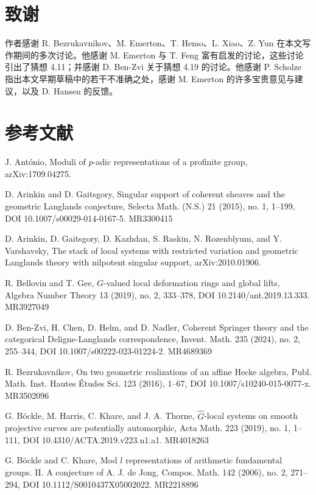 \section*{致谢}
作者感谢 R. Bezrukavnikov、M. Emerton、T. Hemo、L. Xiao、Z. Yun 在本文写作期间的多次讨论。他感谢 M. Emerton 与 T. Feng 富有启发的讨论，这些讨论引出了猜想 4.11；并感谢 D. Ben-Zvi 关于猜想 4.19 的讨论。他感谢 P. Scholze 指出本文早期草稿中的若干不准确之处，感谢 M. Emerton 的许多宝贵意见与建议，以及 D. Hansen 的反馈。

\section*{参考文献}
\begin{refs}
\item[{[1]}] J. Ant\'onio, Moduli of $p$-adic representations of a profinite group, arXiv:1709.04275.
\item[{[2]}] D. Arinkin and D. Gaitsgory, Singular support of coherent sheaves and the geometric Langlands conjecture, Selecta Math. (N.S.) 21 (2015), no. 1, 1--199, DOI 10.1007/s00029-014-0167-5. MR3300415
\item[{[3]}] D. Arinkin, D. Gaitsgory, D. Kazhdan, S. Raskin, N. Rozenblyum, and Y. Varshavsky, The stack of local systems with restricted variation and geometric Langlands theory with nilpotent singular support, arXiv:2010.01906.
\item[{[4]}] R. Bellovin and T. Gee, $G$-valued local deformation rings and global lifts, Algebra Number Theory 13 (2019), no. 2, 333--378, DOI 10.2140/ant.2019.13.333. MR3927049
\item[{[5]}] D. Ben-Zvi, H. Chen, D. Helm, and D. Nadler, Coherent Springer theory and the categorical Deligne-Langlands correspondence, Invent. Math. 235 (2024), no. 2, 255--344, DOI 10.1007/s00222-023-01224-2. MR4689369
\item[{[6]}] R. Bezrukavnikov, On two geometric realizations of an affine Hecke algebra, Publ. Math. Inst. Hautes \'Etudes Sci. 123 (2016), 1--67, DOI 10.1007/s10240-015-0077-x. MR3502096
\item[{[7]}] G. B\"ockle, M. Harris, C. Khare, and J. A. Thorne, $\hat G$-local systems on smooth projective curves are potentially automorphic, Acta Math. 223 (2019), no. 1, 1--111, DOI 10.4310/ACTA.2019.v223.n1.a1. MR4018263
\item[{[8]}] G. B\"ockle and C. Khare, Mod $l$ representations of arithmetic fundamental groups. II. A conjecture of A. J. de Jong, Compos. Math. 142 (2006), no. 2, 271--294, DOI 10.1112/S0010437X05002022. MR2218896

\end{refs}
